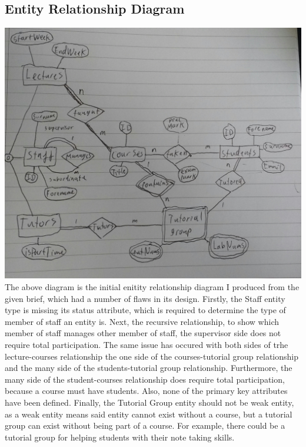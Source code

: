 \documentclass[12pt]{article}
\begin{document}
\subsection{Entity Relationship Diagram}
\includegraphics[width=\linewidth]{ER}
The above diagram is the initial enitity relationship diagram I produced from the given brief, which had a number of flaws in its design.
Firstly, the Staff entity type is missing its status attribute, which is required to determine the type of member of staff an entity is.
Next, the recursive relationship, to show which member of staff manages other member of staff, the supervisor side does not require total participation.
The same issue has occured with both sides of trhe lecture-courses relationship the one side of the courses-tutorial group relationship and the many side of the students-tutorial group relationship.
Furthermore, the many side of the student-courses relationship does require total participation, because a course must have students.
Also, none of the primary key attributes have been defined.
Finally, the Tutorial Group entity should not be weak entity, as a weak entity means said entity cannot exist without a course, but a tutorial group can exist without being part of a course.
For example, there could be a tutorial group for helping students with their note taking skills.
\end{document}
